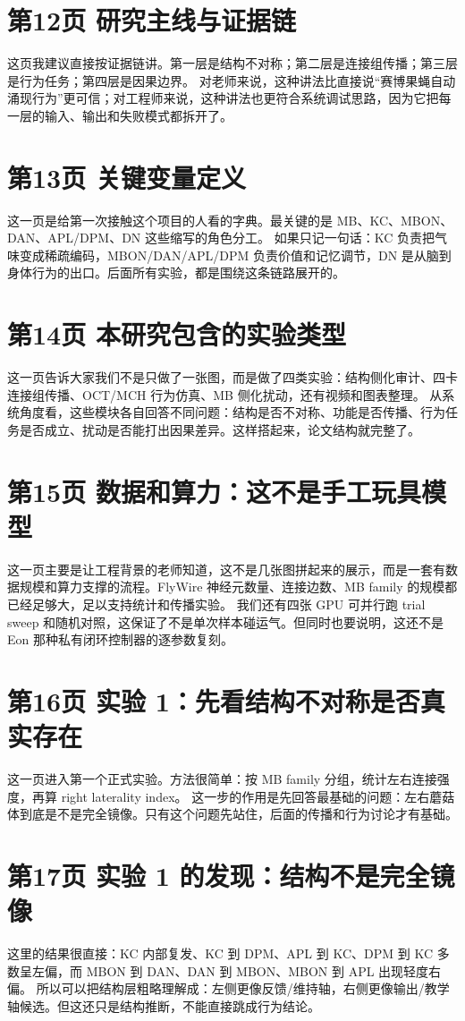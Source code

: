 \documentclass[11pt,fontset=none]{ctexart}
\begin{document}
\section*{第12页 研究主线与证据链}
这页我建议直接按证据链讲。第一层是结构不对称；第二层是连接组传播；第三层是行为任务；第四层是因果边界。
对老师来说，这种讲法比直接说“赛博果蝇自动涌现行为”更可信；对工程师来说，这种讲法也更符合系统调试思路，因为它把每一层的输入、输出和失败模式都拆开了。
\section*{第13页 关键变量定义}
这一页是给第一次接触这个项目的人看的字典。最关键的是 MB、KC、MBON、DAN、APL/DPM、DN 这些缩写的角色分工。
如果只记一句话：KC 负责把气味变成稀疏编码，MBON/DAN/APL/DPM 负责价值和记忆调节，DN 是从脑到身体行为的出口。后面所有实验，都是围绕这条链路展开的。
\section*{第14页 本研究包含的实验类型}
这一页告诉大家我们不是只做了一张图，而是做了四类实验：结构侧化审计、四卡连接组传播、OCT/MCH 行为仿真、MB 侧化扰动，还有视频和图表整理。
从系统角度看，这些模块各自回答不同问题：结构是否不对称、功能是否传播、行为任务是否成立、扰动是否能打出因果差异。这样搭起来，论文结构就完整了。
\section*{第15页 数据和算力：这不是手工玩具模型}
这一页主要是让工程背景的老师知道，这不是几张图拼起来的展示，而是一套有数据规模和算力支撑的流程。FlyWire 神经元数量、连接边数、MB family 的规模都已经足够大，足以支持统计和传播实验。
我们还有四张 GPU 可并行跑 trial sweep 和随机对照，这保证了不是单次样本碰运气。但同时也要说明，这还不是 Eon 那种私有闭环控制器的逐参数复刻。
\section*{第16页 实验 1：先看结构不对称是否真实存在}
这一页进入第一个正式实验。方法很简单：按 MB family 分组，统计左右连接强度，再算 right laterality index。
这一步的作用是先回答最基础的问题：左右蘑菇体到底是不是完全镜像。只有这个问题先站住，后面的传播和行为讨论才有基础。
\section*{第17页 实验 1 的发现：结构不是完全镜像}
这里的结果很直接：KC 内部复发、KC 到 DPM、APL 到 KC、DPM 到 KC 多数呈左偏，而 MBON 到 DAN、DAN 到 MBON、MBON 到 APL 出现轻度右偏。
所以可以把结构层粗略理解成：左侧更像反馈/维持轴，右侧更像输出/教学轴候选。但这还只是结构推断，不能直接跳成行为结论。
\end{document}
